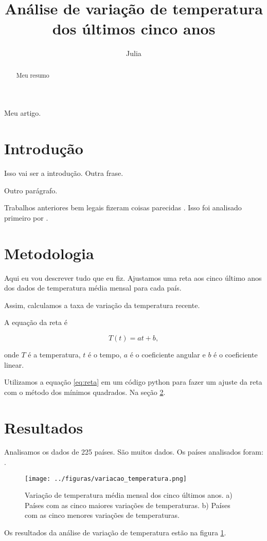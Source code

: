 \documentclass{article}
\newcommand{\Title}{Análise de variação de temperatura dos últimos cinco anos} %
\begin{document}
\title{\Title} %
\author{Julia}

\maketitle 

\begin{abstract}
Meu resumo 
\end{abstract}
	Meu artigo. 
	
\section{Introdução}
Isso vai ser a introdução.
Outra frase.

Outro parágrafo. %

Trabalhos anteriores bem legais fizeram coisas parecidas 
\citep{}.	%
Isso foi analisado primeiro por \citet{}. %

\section{Metodologia}
\label{sec:metodos}

Aqui eu vou descrever tudo que eu fiz. Ajustamos uma reta aos cinco último anos dos dados 
de temperatura média mensal para cada país. 

Assim, calculamos a taxa de variação da temperatura recente. 


A equação da reta é 

\begin{equation}
T(t) = a t + b, 
\label{eq:reta}
\end{equation}

\noindent
onde $T$ é a temperatura, $t$ é o tempo, $a$ é o coeficiente angular e $b$ é o coeficiente linear. 

Utilizamos a equação \ref{eq:reta} em um código python para fazer um ajuste da reta com o método dos mínimos quadrados. Na seção \ref{sec:metodos}.

\section{Resultados}

Analisamos os dados de 225 países. São muitos dados. 
Os países analisados foram: \Paises. 

\begin{figure}[!htb] %
\centering 
\texttt{[image: ../figuras/variacao\_temperatura.png]} %
\caption{Variação de temperatura média mensal dos cinco últimos anos. a) Países com as cinco maiores variações de temperaturas. 
b) Países com as cinco menores variações de temperaturas.}
\label{fig:variacao}
\end{figure}

Os resultados da análise de variação de temperatura estão na figura \ref{fig:variacao}.


\end{document}
